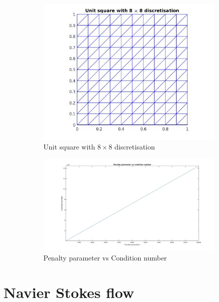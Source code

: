 \documentclass[a4paper]{book}
\begin{document}
\begin{figure}
\begin{subfigure}{\textwidth}	
  \includegraphics[width=\linewidth]{grid_penalty_parameter.jpg}
  \caption{Unit square with $8 \times 8$ discretisation}
  \label{grid_penalty_para}
\end{subfigure}
\begin{subfigure}{\textwidth}	
	\includegraphics[width=\linewidth]{penalty_condition_number.jpg}
	\caption{Penalty parameter vs Condition number}
	\label{penalty_condition_number}
\end{subfigure}
\caption{\label{effect_penalty_parameter}}
\end{figure}

\section{Navier Stokes flow}\label{N-S-ch5}
\end{document}
